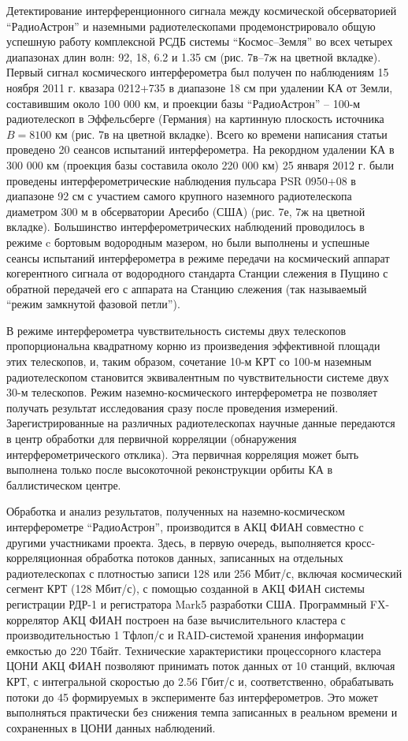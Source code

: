 Детектирование интерференционного сигнала между космической обсерваторией
``РадиоАстрон''
и наземными радиотелескопами продемонстрировало общую успешную работу
комплексной РСДБ системы ``Космос--Земля'' во всех четырех диапазонах длин волн:
92, 18, 6.2 и 1.35 см (рис. 7в--7ж на цветной вкладке).
Первый сигнал космического
интерферометра был получен по наблюдениям 15 ноября 2011 г. квазара 0212+735 в
диапазоне 18 см при удалении КА от Земли, составившим около 100 000 км,
и проекции базы ``РадиоАстрон'' -- 100-м радиотелескоп в Эффельсберге
(Германия) на картинную плоскость источника $B = 8100$ км (рис. 7в на цветной вкладке).
Всего ко времени написания статьи проведено 20 сеансов испытаний интерферометра.
На рекордном удалении КА в 300 000 км (проекция базы составила
около 220 000 км) 25 января 2012 г. были проведены интерферометрические
наблюдения пульсара PSR 0950+08 в диапазоне 92 см с участием самого крупного
наземного радиотелескопа диаметром 300 м в обсерватории Аресибо (США) (рис. 7е, 7ж на цветной
вкладке).
Большинство
интерферометрических наблюдений проводилось в режиме c бортовым водородным
мазером, но были выполнены и успешные сеансы испытаний интерферометра в режиме
передачи на космический аппарат когерентного сигнала от водородного стандарта
Станции слежения в Пущино с обратной передачей его с аппарата на Станцию слежения
(так называемый ``режим замкнутой фазовой петли'').

В режиме интерферометра чувствительность системы двух телескопов
пропорциональна квадратному корню из произведения эффективной
площади этих телескопов, и, таким образом, сочетание 10-м КРТ со 100-м
наземным радиотелескопом становится эквивалентным по чувствительности
системе двух 30-м телескопов. Режим наземно-космического
интерферометра не позволяет
получать результат исследования сразу после проведения измерений.
Зарегистрированные на различных радиотелескопах научные данные
передаются в центр обработки для первичной корреляции (обнаружения
интерферометрического отклика). Эта первичная корреляция может быть
выполнена только после высокоточной реконструкции орбиты КА в
баллистическом центре.

Обработка и анализ результатов,
полученных на наземно-космическом интерферометре ``РадиоАстрон'',
производится в АКЦ ФИАН совместно с другими участниками проекта. Здесь,
в первую очередь, выполняется кросс-корреляционная обработка потоков
данных, записанных на отдельных радиотелескопах с плотностью записи 128
или 256 Мбит/с, включая космический сегмент КРТ (128 Мбит/с),
с помощью созданной в АКЦ ФИАН системы регистрации РДР-1
\cite{} и регистратора Mark5 \cite{} разработки
США. Программный FX-коррелятор АКЦ ФИАН построен на базе вычислительного
кластера с производительностью 1 Тфлоп/с и RAID-системой хранения
информации емкостью до 220 Тбайт.
Технические характеристики процессорного кластера ЦОНИ АКЦ ФИАН
позволяют принимать поток данных от 10 станций, включая КРТ, с
интегральной скоростью до 2.56 Гбит/с и, соответственно, обрабатывать
потоки до 45 формируемых в эксперименте баз интерферометров.
Это может выполняться практически без снижения темпа записанных
в реальном времени и сохраненных в ЦОНИ данных наблюдений.



